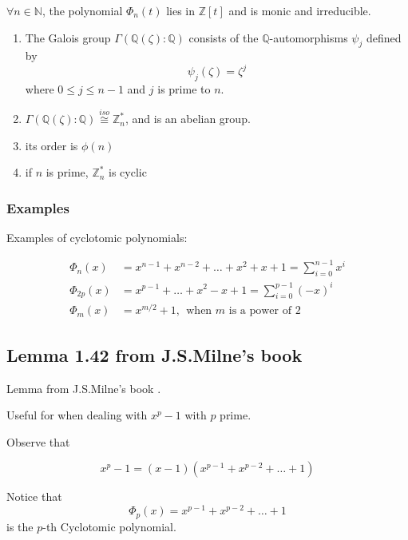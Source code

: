 \documentclass{article}
\theoremstyle{definition}
\newenvironment{thm}[1]
{\renewcommand\theinnerthm{#1}\innerthm}
{\endinnerthm}
\newenvironment{cor}[1]
{\renewcommand\theinnercor{#1}\innercor}
{\endinnercor}
\begin{document}
\begin{cor}{21.6}
  $\forall n \in \mathbb{N}$, the polynomial $\Phi_n(t)$ lies in $\mathbb{Z}[t]$ and is monic and irreducible.
\end{cor}

\begin{thm}{21.9}
  \begin{enumerate}
    \item The Galois group $\Gamma(\mathbb{Q}(\zeta):\mathbb{Q})$ consists of the
    $\mathbb{Q}$-automorphisms $\psi_j$ defined by
    $$\psi_j(\zeta)=\zeta^j$$
    where $0 \leq j \leq n-1$ and $j$ is prime to $n$.

    \item $\Gamma(\mathbb{Q}(\zeta):\mathbb{Q}) \stackrel{iso}{\cong} \mathbb{Z}_n^*$, and is an abelian group.
    \item its order is $\phi(n)$
    \item if $n$ is prime, $\mathbb{Z}_n^*$ is cyclic
  \end{enumerate}
\end{thm}



\vspace{1cm}

\subsubsection{Examples}
Examples of cyclotomic polynomials:

\begin{align*}
  \Phi_n(x) &= x^{n-1} + x^{n-2} + \ldots + x^2 + x + 1 = \sum_{i=0}^{n-1} x^i\\
  \Phi_{2p}(x) &= x^{p-1} + \ldots + x^2 - x + 1 = \sum_{i=0}^{p-1} (-x)^i\\
  \Phi_m(x) &= x^{m/2} + 1, ~~\text{when $m$ is a power of $2$}
\end{align*}


\subsection{Lemma 1.42 from J.S.Milne's book}
Lemma from J.S.Milne's book \cite{milneFT}.

Useful for when dealing with $x^p - 1$ with $p$ prime.

Observe that

$$x^p -1 = (x-1)(x^{p-1} + x^{p-2} + \ldots + 1)$$

Notice that
$$\Phi_p(x) = x^{p-1} + x^{p-2} + \ldots + 1$$
is the $p$-th Cyclotomic polynomial.
\end{document}
